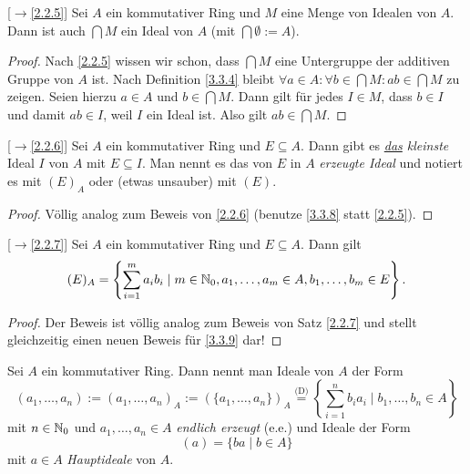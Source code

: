 \documentclass[../../main.tex]{subfiles}
\begin{document}
\begin{pro}{\rm[$\to$\ref{2.2.5}]}\label{3.3.8}
Sei $A$ ein kommutativer Ring und $M$ eine Menge von Idealen von $A$. Dann ist auch $\bigcap M$ ein Ideal von $A$ (mit $\bigcap\emptyset:=A$).
\end{pro}
\begin{proof}
Nach \ref{2.2.5} wissen wir schon, dass $\bigcap M$ eine Untergruppe der additiven Gruppe von $A$ ist. Nach Definition \ref{3.3.4} bleibt $\forall a\in A:\forall b\in\bigcap M:ab\in\bigcap M$ zu zeigen.
Seien hierzu $a\in A$ und $b\in\bigcap M$. Dann gilt für jedes $I\in M$, dass $b\in I$ und damit $ab\in I$, weil $I$ ein Ideal ist. Also gilt $ab\in\bigcap M$.
\end{proof}

\begin{satdef}{\rm[$\to$\ref{2.2.6}]}\label{3.3.9}
Sei $A$ ein kommutativer Ring und $E\subseteq A$. Dann gibt es \emph{\underline{das} kleinste} Ideal $I$ von $A$ mit $E\subseteq I$. Man nennt es das von $E$ in $A$ \emph{erzeugte Ideal} und notiert es mit $(E)_A$ oder (etwas unsauber) mit $(E)$.
\end{satdef}

\begin{proof}
Völlig analog zum Beweis von \ref{2.2.6} (benutze \ref{3.3.8} statt \ref{2.2.5}).
\end{proof}

\begin{sat}{\rm[$\to$\ref{2.2.7}]}\label{3.3.10}
Sei $A$ ein kommutativer Ring und $E\subseteq A$. Dann gilt
$$(E)_A=\left\{\sum_{i=1}^ma_ib_i\mid m\in\mathbb N_0,a_1,\dots,a_m\in A,b_1,\dots,b_m\in E\right\}.$$
\end{sat}
\begin{proof}
Der Beweis ist völlig analog zum Beweis von Satz \ref{2.2.7} und stellt gleichzeitig einen neuen Beweis für \ref{3.3.9} dar!
\end{proof}

\begin{df}\label{3.3.11}
Sei $A$ ein kommutativer Ring. Dann nennt man Ideale von $A$ der Form
$$(a_1,\dots,a_n):=(a_1,\dots,a_n)_A:=(\{a_1,\dots,a_n\})_A\overset{\text{(D)}}=\left\{\sum_{i=1}^nb_ia_i\mid b_1,\dots,b_n\in A\right\}$$
mit $n\in\mathbb N_0$ und $a_1,\dots,a_n\in A$ \emph{endlich erzeugt} (e.e.) und Ideale der Form
$$(a)=\{ba\mid b\in A\}$$ mit $a\in A$ \emph{Hauptideale} von $A$.
\end{df}
\end{document}
